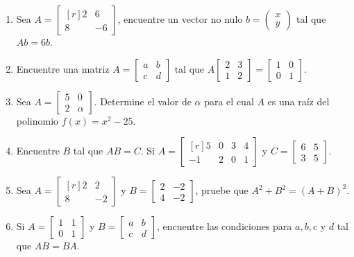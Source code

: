 \begin{enumerate}[start=36]
    \item Sea $A=\begin{bmatrix*}[r]2 & 6 \\ 8 & -6\end{bmatrix*}$, encuentre un vector no nulo $b=\begin{pmatrix*}x \\ y\end{pmatrix*}$ tal que $A b=6 b$.
    \item Encuentre una matriz $A=\begin{bmatrix*}a & b \\ c & d\end{bmatrix*}$ tal que $A\begin{bmatrix*}2 & 3 \\ 1 & 2\end{bmatrix*}=\begin{bmatrix*}1 & 0 \\ 0 & 1\end{bmatrix*}$.
    \item Sea $A=\begin{bmatrix*}5 & 0 \\ 2 & \alpha\end{bmatrix*}$. Determine el valor de $\alpha$ para el cual $A$ es una raíz del polinomio $f(x)=x^{2}-25$.
    \item Encuentre $B$ tal que $A B=C$. Si $A=\begin{bmatrix*}[r]5 & 0 & 3 & 4 \\ -1 & 2 & 0 & 1\end{bmatrix*}$ y $C=\begin{bmatrix*}6 & 5 \\ 3 & 5\end{bmatrix*}$.
    \item Sea $A=\begin{bmatrix*}[r]2 & 2 \\ 8 & -2\end{bmatrix*}$ y $B=\begin{bmatrix*}2 & -2 \\ 4 & -2\end{bmatrix*}$, pruebe que $A^{2}+B^{2}=(A+B)^{2}$.
    \item Si $A=\begin{bmatrix*}1 & 1 \\ 0 & 1\end{bmatrix*}$ y $B=\begin{bmatrix*}a & b \\ c & d\end{bmatrix*}$, encuentre las condiciones para $a, b, c$ y $d$ tal que $A B=B A$.

\end{enumerate}
